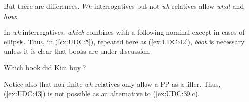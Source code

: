 \documentclass[output=paper
                ,modfonts
                ,nonflat
	        ,collection
	        ,collectionchapter
	        ,collectiontoclongg
 	        ,biblatex
                ,babelshorthands
                ,newtxmath
                ,draftmode
                ,colorlinks, citecolor=brown
]{./langsci/langscibook}
\begin{document}
{\begin{exe} \ex \begin{xlist} \label{ex:UDC:38}

\end{xlist}
\end{exe}

\begin{exe} \ex \begin{xlist} \label{ex:UDC:39}

\end{xlist}
\end{exe}

\noindent
But there are differences. \emph{Wh}-interrogatives but not
\emph{wh}-relatives allow \emph{what} and \emph{how}:

\begin{exe} \ex \begin{xlist} \label{ex:UDC:40}

\end{xlist}
\end{exe}\noindent

\begin{exe} \ex \begin{xlist} \label{ex:UDC:41}
\ex[]{How did Lee do it \gap{} {]}}

\end{xlist}
\end{exe}

\noindent
In \emph{wh}-interrogatives, \emph{which} combines with a following
nominal except in cases of ellipsis. Thus, in (\ref{ex:UDC:5}), repeated here as (\ref{ex:UDC:42}), \emph{book} is
necessary unless it is clear that books are under discussion.

\begin{exe}
\ex \label{ex:UDC:42}
 Which book did Kim buy \gap{}?
\end{exe}\noindent
Notice also that non-finite \emph{wh}-relatives only allow a PP as a
filler. Thus, (\ref{ex:UDC:43}) is not possible as an alternative to (\ref{ex:UDC:39}c).

\begin{exe}
     \label{ex:UDC:43}
\end{exe}

}
\end{document}
